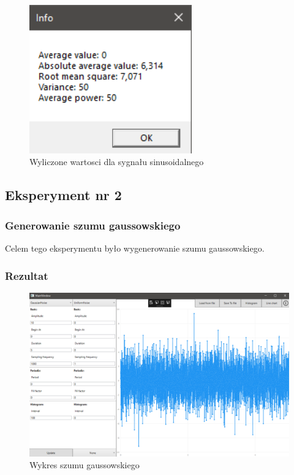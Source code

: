 \documentclass[12pt]{article}
\begin{document}
\begin{figure}[H]
 \centering
 \includegraphics[width=7cm]{images/sin1info.PNG}
 \vspace{-0.3cm}
 \caption{Wyliczone wartosci dla sygnału sinusoidalnego}
 \label{gui}
\end{figure}


\newpage
\subsection{Eksperyment nr 2}
\subsubsection{Generowanie szumu gaussowskiego}
Celem tego eksperymentu było wygenerowanie szumu gaussowskiego.


\subsubsection{Rezultat}

\begin{figure}[H]
 \centering
 \includegraphics[width=14cm]{images/gauss1.PNG}
 \vspace{-0.3cm}
 \caption{Wykres szumu gaussowskiego}
 \label{gui}
\end{figure}
\end{document}
